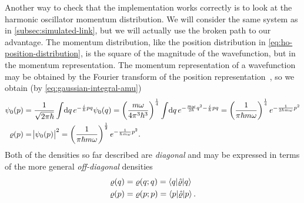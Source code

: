Another way to check that the implementation works correctly is to look at the harmonic oscillator momentum distribution.
We will consider the same system as in \cref{subsec:simulated-link}, but we will actually use the broken path to our advantage.
The momentum distribution, like the position distribution in \cref{eq:ho-position-distribution}, is the square of the magnitude of the wavefunction, but in the momentum representation.
The momentum representation of a wavefunction may be obtained by the Fourier transform of the position representation~\cite{ceperley1995path}, so we obtain (by \vref{eq:gaussian-integral-amu})
\begin{subequations}
\begin{align}
	\psi_0(p)
	&= \frac{1}{\sqrt{2 \pi \hbar}} \int\! \dif q \, e^{-\frac{i}{\hbar} p q} \psi_0(q)
	= \left( \frac{m \omega}{4 \pi^3 \hbar^3} \right)^\frac{1}{4} \int\! \dif q \, e^{-\frac{m \omega}{2 \hbar} q^2 - \frac{i}{\hbar} p q}
	= \left( \frac{1}{\pi \hbar m \omega} \right)^\frac{1}{4} e^{-\frac{1}{2 \hbar m \omega} p^2} \\
	\rho(p)
	&= \abs{\psi_0(p)}^2
	= \left( \frac{1}{\pi \hbar m \omega} \right)^\frac{1}{2} e^{-\frac{1}{\hbar m \omega} p^2}.
\end{align}
\end{subequations}
Both of the densities so far described are \emph{diagonal} and may be expressed in terms of the more general \emph{off-diagonal} densities
\begin{subequations}
\begin{align}
	\varrho(q)
	&= \varrho(q ; q)
	= \braket{q | \hat{\varrho} | q} \\
	\varrho(p)
	&= \varrho(p ; p)
	= \braket{p | \hat{\varrho} | p}.
\end{align}
\end{subequations}

